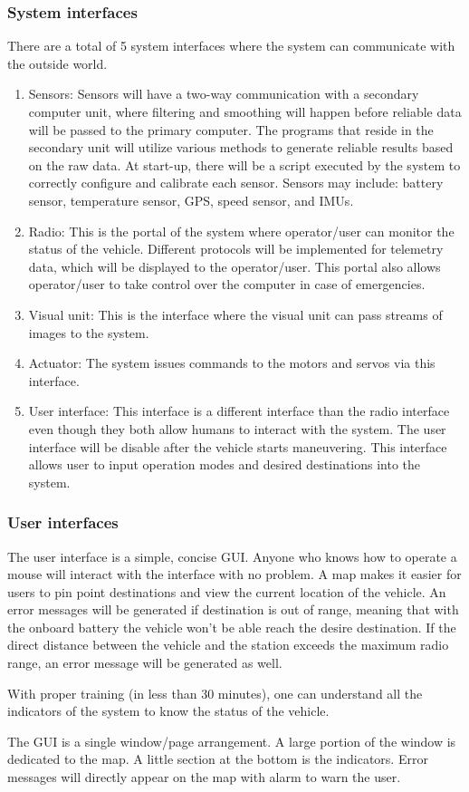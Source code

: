 \documentclass[draftclsnofoot,onecolumn,10pt]{IEEEtran}
\begin{document}
\subsubsection{System interfaces} %
There are a total of 5 system interfaces where the system can communicate with 
the outside world.
\begin{enumerate}
	\item Sensors: Sensors will have a two-way communication with a secondary 
computer unit, where filtering and smoothing will happen before reliable data will 
be passed to the primary computer. The programs that reside in the secondary unit 
will utilize various methods to generate reliable results based on the raw data. 
At start-up, there will be a script executed by the system to correctly configure 
and calibrate each sensor. Sensors may include: battery sensor, temperature sensor, 
GPS, speed sensor, and IMUs.
	\item Radio: This is the portal of the system where operator/user can monitor 
the status of the vehicle. Different protocols will be implemented for telemetry data, 
which will be displayed to the operator/user. This portal also allows operator/user to 
take control over the computer in case of emergencies. 
	\item Visual unit: This is the interface where the visual unit can pass streams 
of images to the system.
	\item Actuator: The system issues commands to the motors and servos via this 
interface. 
	\item User interface: This interface is a different interface than the radio 
interface even though they both allow humans to interact with the system. The user 
interface will be disable after the vehicle starts maneuvering. This interface allows 
user to input operation modes and desired destinations into the system.
\end{enumerate}

\subsubsection{User interfaces} %
The user interface is a simple, concise GUI. Anyone who knows how to operate a mouse 
will interact with the interface with no problem. A map makes it easier for users to 
pin point destinations and view the current location of the vehicle. An error messages 
will be generated if destination is out of range, meaning that with the onboard battery 
the vehicle won’t be able reach the desire destination. If the direct distance between 
the vehicle and the station exceeds the maximum radio range, an error message will be 
generated as well.\par
With proper training (in less than 30 minutes), one can understand all the indicators 
of the system to know the status of the vehicle.\par
The GUI is a single window/page arrangement. A large portion of the window is dedicated 
to the map. A little section at the bottom is the indicators. Error messages will directly 
appear on the map with alarm to warn the user.\par
\end{document}
